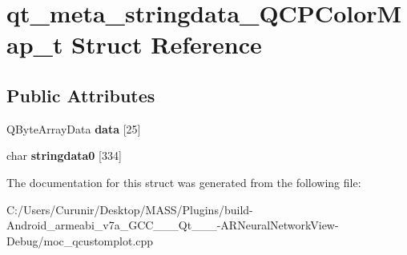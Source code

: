 \hypertarget{structqt__meta__stringdata___q_c_p_color_map__t}{}\section{qt\+\_\+meta\+\_\+stringdata\+\_\+\+Q\+C\+P\+Color\+Map\+\_\+t Struct Reference}
\label{structqt__meta__stringdata___q_c_p_color_map__t}
\subsection*{Public Attributes}
\begin{DoxyCompactItemize}
\item 
\mbox{\label{structqt__meta__stringdata___q_c_p_color_map__t_ae47af72e10dab09b8bdc30bfdd9871cf}} 
Q\+Byte\+Array\+Data {\bfseries data} \mbox{[}25\mbox{]}
\item 
\mbox{\label{structqt__meta__stringdata___q_c_p_color_map__t_ae86ea0a7c4d2123df474dc23f0bf8622}} 
char {\bfseries stringdata0} \mbox{[}334\mbox{]}
\end{DoxyCompactItemize}


The documentation for this struct was generated from the following file\+:\begin{DoxyCompactItemize}
\item 
C\+:/\+Users/\+Curunir/\+Desktop/\+M\+A\+S\+S/\+Plugins/build-\/\+Android\+\_\+armeabi\+\_\+v7a\+\_\+\+G\+C\+C\+\_\+\_\+\_\+\+Qt\+\_\+\_\+\_-\/\+A\+R\+Neural\+Network\+View-\/\+Debug/moc\+\_\+qcustomplot.\+cpp\end{DoxyCompactItemize}
